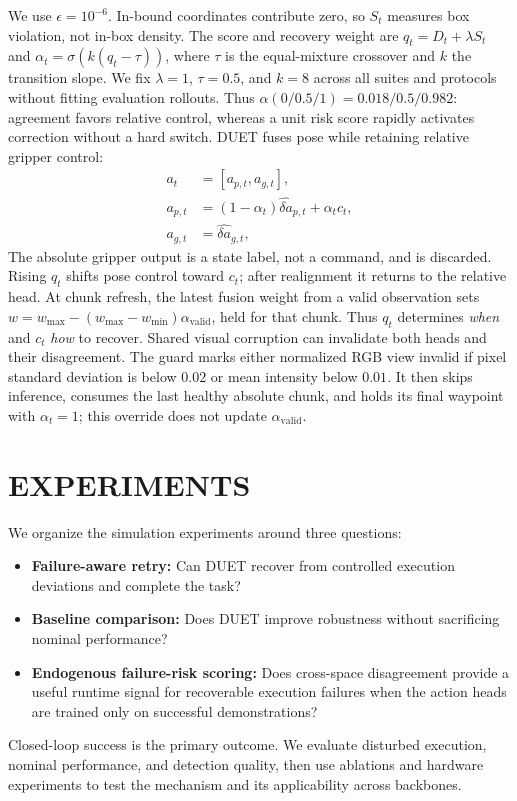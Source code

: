 \documentclass[letterpaper, 10 pt, conference]{ieeeconf}
\begin{document}
We use $\epsilon{=}10^{-6}$. In-bound coordinates contribute zero, so $S_t$ measures box violation, not in-box density. The score and recovery weight are $q_t=D_t+\lambda S_t$ and $\alpha_t=\sigma(k(q_t-\tau))$, where $\tau$ is the equal-mixture crossover and $k$ the transition slope. We fix $\lambda{=}1$, $\tau{=}0.5$, and $k{=}8$ across all suites and protocols without fitting evaluation rollouts. Thus $\alpha(0/0.5/1){=}0.018/0.5/0.982$: agreement favors relative control, whereas a unit risk score rapidly activates correction without a hard switch. DUET fuses pose while retaining relative gripper control:
\begin{align}
    a_t &= [a_{p,t},a_{g,t}], \\
    a_{p,t} &= (1-\alpha_t)\hat{\delta a}_{p,t} + \alpha_t c_t, \\
    a_{g,t} &= \hat{\delta a}_{g,t},
    \label{eq:fused_action}
\end{align}
The absolute gripper output is a state label, not a command, and is discarded. Rising $q_t$ shifts pose control toward $c_t$; after realignment it returns to the relative head. At chunk refresh, the latest fusion weight from a valid observation sets $w=w_{\max}-(w_{\max}-w_{\min})\alpha_{\mathrm{valid}}$, held for that chunk. Thus $q_t$ determines \emph{when} and $c_t$ \emph{how} to recover. Shared visual corruption can invalidate both heads and their disagreement. The guard marks either normalized RGB view invalid if pixel standard deviation is below $0.02$ or mean intensity below $0.01$. It then skips inference, consumes the last healthy absolute chunk, and holds its final waypoint with $\alpha_t{=}1$; this override does not update $\alpha_{\mathrm{valid}}$.

\section{EXPERIMENTS}
\label{sec:experiments}

\begin{samepage}
We organize the simulation experiments around three questions:
\begin{itemize}
    \setlength{\itemsep}{0pt}
    \setlength{\parsep}{0pt}
    \setlength{\topsep}{2pt}
    \item[\textbf{(Q1)}] \textbf{Failure-aware retry:} Can DUET recover from controlled execution deviations and complete the task?
    \item[\textbf{(Q2)}] \textbf{Baseline comparison:} Does DUET improve robustness without sacrificing nominal performance?
    \item[\textbf{(Q3)}] \textbf{Endogenous failure-risk scoring:} Does cross-space disagreement provide a useful runtime signal for recoverable execution failures when the action heads are trained only on successful demonstrations?
\end{itemize}
Closed-loop success is the primary outcome. We evaluate disturbed execution, nominal performance, and detection quality, then use ablations and hardware experiments to test the mechanism and its applicability across backbones.
\end{samepage}
\end{document}
